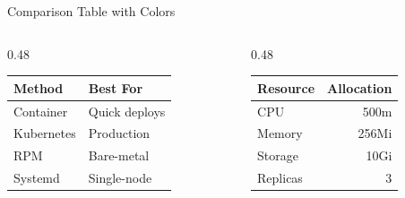 \begin{frame}{Comparison Table with Colors}
  \begin{columns}[T]
    \begin{column}{0.48\textwidth}
      \begin{center}
        \scriptsize
        \begin{tabular}{|l|l|}
          \hline
          \textbf{Method} & \textbf{Best For} \\
          \hline
          Container & Quick deploys \\
          \hline
          Kubernetes & Production \\
          \hline
          RPM & Bare-metal \\
          \hline
          Systemd & Single-node \\
          \hline
        \end{tabular}
      \end{center}
    \end{column}
    \begin{column}{0.48\textwidth}
      \begin{center}
        \scriptsize
        \begin{tabular}{|l|r|}
          \hline
          \textbf{Resource} & \textbf{Allocation} \\
          \hline
          CPU & 500m \\
          \hline
          Memory & 256Mi \\
          \hline
          Storage & 10Gi \\
          \hline
          Replicas & 3 \\
          \hline
        \end{tabular}
      \end{center}
    \end{column}
  \end{columns}
\end{frame}
